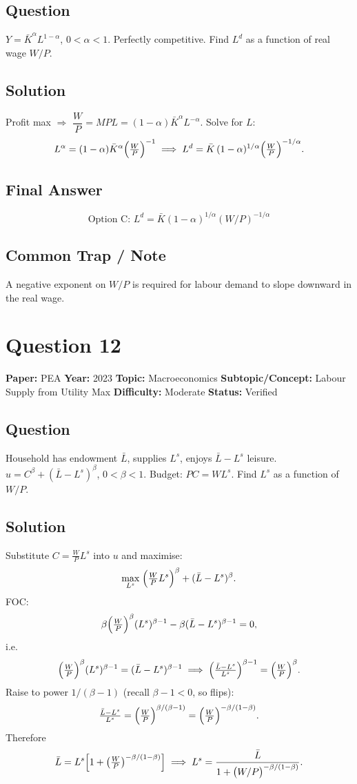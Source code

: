 \documentclass[11pt]{article}
\begin{document}
\subsection*{Question}
$Y=\bar K^\alpha L^{1-\alpha}$, $0<\alpha<1$. Perfectly competitive. Find $L^d$ as a function of real wage $W/P$.

\subsection*{Solution}
Profit max $\Rightarrow$ $\dfrac{W}{P}=MPL=(1-\alpha)\bar K^\alpha L^{-\alpha}$. Solve for $L$:
\[
L^\alpha=(1-\alpha)\bar K^\alpha\Bigl(\tfrac{W}{P}\Bigr)^{-1}
\;\Longrightarrow\;
L^d=\bar K\,(1-\alpha)^{1/\alpha}\Bigl(\tfrac{W}{P}\Bigr)^{-1/\alpha}.
\]

\subsection*{Final Answer}
\[
\boxed{\text{Option C: } L^d=\bar K(1-\alpha)^{1/\alpha}(W/P)^{-1/\alpha}}
\]

\subsection*{Common Trap / Note}
A negative exponent on $W/P$ is required for labour demand to slope downward in the real wage.

\medskip

\section*{Question 12}
\textbf{Paper:} PEA \quad \textbf{Year:} 2023 \quad \textbf{Topic:} Macroeconomics \quad \textbf{Subtopic/Concept:} Labour Supply from Utility Max \quad \textbf{Difficulty:} Moderate \quad \textbf{Status:} Verified

\subsection*{Question}
Household has endowment $\bar L$, supplies $L^s$, enjoys $\bar L-L^s$ leisure. $u=C^\beta+(\bar L-L^s)^\beta$, $0<\beta<1$. Budget: $PC=WL^s$. Find $L^s$ as a function of $W/P$.

\subsection*{Solution}
Substitute $C=\frac{W}{P}L^s$ into $u$ and maximise:
\[
\max_{L^s}\;\Bigl(\tfrac{W}{P}L^s\Bigr)^\beta+(\bar L-L^s)^\beta.
\]
FOC:
\[
\beta\Bigl(\tfrac{W}{P}\Bigr)^\beta(L^s)^{\beta-1}-\beta(\bar L-L^s)^{\beta-1}=0,
\]
i.e.\
\[
\Bigl(\tfrac{W}{P}\Bigr)^\beta(L^s)^{\beta-1}=(\bar L-L^s)^{\beta-1}
\;\Longrightarrow\; \Bigl(\tfrac{\bar L-L^s}{L^s}\Bigr)^{\beta-1}=\Bigl(\tfrac{W}{P}\Bigr)^\beta.
\]
Raise to power $1/(\beta-1)$ (recall $\beta-1<0$, so flips):
\[
\tfrac{\bar L-L^s}{L^s}=\Bigl(\tfrac{W}{P}\Bigr)^{\beta/(\beta-1)}=\Bigl(\tfrac{W}{P}\Bigr)^{-\beta/(1-\beta)}.
\]
Therefore
\[
\bar L=L^s\Bigl[1+\bigl(\tfrac{W}{P}\bigr)^{-\beta/(1-\beta)}\Bigr]
\;\Longrightarrow\; L^s=\dfrac{\bar L}{1+\bigl(W/P\bigr)^{-\beta/(1-\beta)}}.
\]
\end{document}
